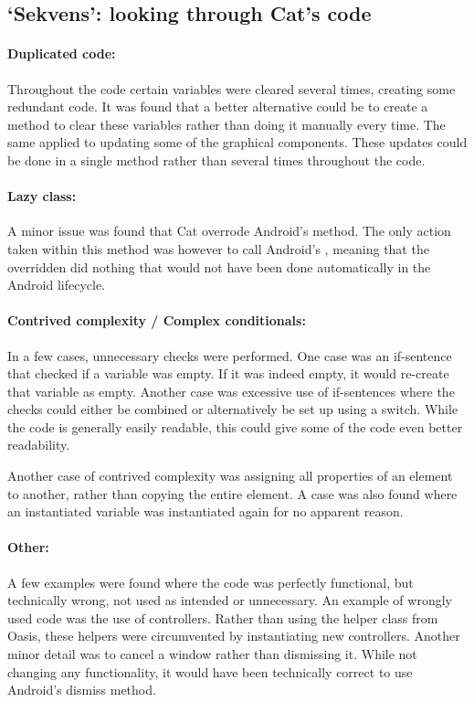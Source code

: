 \subsection{`Sekvens': looking through Cat's code}\label{subsec:collab_catcorrections}

\paragraph{Duplicated code:}
Throughout the code certain variables were cleared several times, creating some redundant code. It was found that a better alternative could be to create a method to clear these variables rather than doing it manually every time. The same applied to updating some of the graphical components. These updates could be done in a single method rather than several times throughout the code.

\paragraph{Lazy class:}
A minor issue was found that Cat overrode Android's  method. The only action taken within this method was however to call Android's , meaning that the overridden  did nothing that would not have been done automatically in the Android lifecycle.

\paragraph{Contrived complexity / Complex conditionals:}
In a few cases, unnecessary checks were performed. One case was an if-sentence that checked if a variable was empty. If it was indeed empty, it would re-create that variable as empty.
Another case was excessive use of if-sentences where the checks could either be combined or alternatively be set up using a switch.
While the code is generally easily readable, this could give some of the code even better readability.

Another case of contrived complexity was assigning all properties of an element to another, rather than copying the entire element.
A case was also found where an instantiated variable was instantiated again for no apparent reason.

\paragraph{Other:}
A few examples were found where the code was perfectly functional, but technically wrong, not used as intended or unnecessary.
An example of wrongly used code was the use of controllers. Rather than using the helper class from Oasis, these helpers were circumvented by instantiating new controllers.
Another minor detail was to cancel a window rather than dismissing it. While not changing any functionality, it would have been technically correct to use Android's dismiss method.

